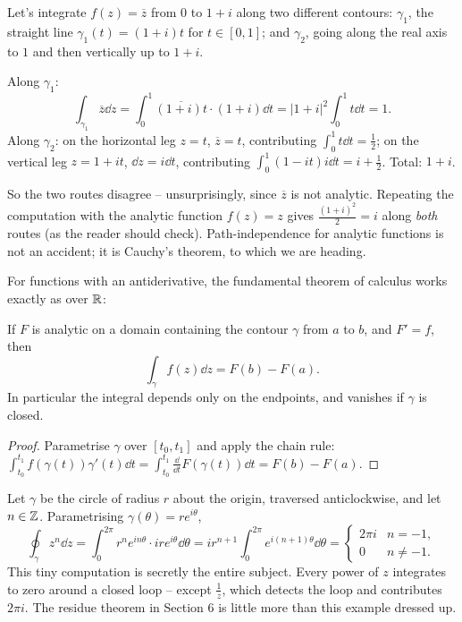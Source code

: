 \documentclass[a4paper]{scrartcl}
\begin{document}
\begin{example}
	Let's integrate $f(z) = \overline z$ from $0$ to $1 + i$ along two different contours: $\gamma_1$, the straight line $\gamma_1(t) = (1 + i)t$ for $t \in [0,1]$; and $\gamma_2$, going along the real axis to $1$ and then vertically up to $1 + i$.

	Along $\gamma_1$:
	$$
	\int_{\gamma_1} \overline z \dd z = \int_0^1 \overline{(1+i)t} \cdot (1 + i) \dd t = |1 + i|^2 \int_0^1 t \dd t = 1.
	$$
	Along $\gamma_2$: on the horizontal leg $z = t$, $\overline z = t$, contributing $\int_0^1 t \dd t = \frac 12$; on the vertical leg $z = 1 + it$, $\dd z = i \dd t$, contributing $\int_0^1 (1 - it) i \dd t = i + \frac{1}{2}$. Total: $1 + i$.

	So the two routes disagree -- unsurprisingly, since $\overline z$ is not analytic. Repeating the computation with the analytic function $f(z) = z$ gives $\frac{(1+i)^2}{2} = i$ along \emph{both} routes (as the reader should check). Path-independence for analytic functions is not an accident; it is Cauchy's theorem, to which we are heading.
\end{example}

For functions with an antiderivative, the fundamental theorem of calculus works exactly as over $\mathbb{R}$:

\begin{proposition}
	If $F$ is analytic on a domain containing the contour $\gamma$ from $a$ to $b$, and $F' = f$, then
	$$
	\int_\gamma f(z) \dd z = F(b) - F(a).
	$$
	In particular the integral depends only on the endpoints, and vanishes if $\gamma$ is closed.
\end{proposition}
\begin{proof}
	Parametrise $\gamma$ over $[t_0, t_1]$ and apply the chain rule: $\int_{t_0}^{t_1} f(\gamma(t))\gamma'(t) \dd t = \int_{t_0}^{t_1} \frac{\dd}{\dd t} F(\gamma(t)) \dd t = F(b) - F(a)$.
\end{proof}

\begin{example}
	Let $\gamma$ be the circle of radius $r$ about the origin, traversed anticlockwise, and let $n \in \mathbb{Z}$. Parametrising $\gamma(\theta) = re^{i\theta}$,
	$$
	\oint_\gamma z^n \dd z = \int_0^{2\pi} r^n e^{in\theta} \cdot ir e^{i\theta} \dd \theta = i r^{n+1}\int_0^{2\pi} e^{i(n+1)\theta} \dd\theta =
	\begin{cases}
		2\pi i & n = -1, \\
		0 & n \neq -1.
	\end{cases}
	$$
	This tiny computation is secretly the entire subject. Every power of $z$ integrates to zero around a closed loop -- except $\frac 1z$, which detects the loop and contributes $2\pi i$. The residue theorem in Section 6 is little more than this example dressed up.
\end{example}
\end{document}
